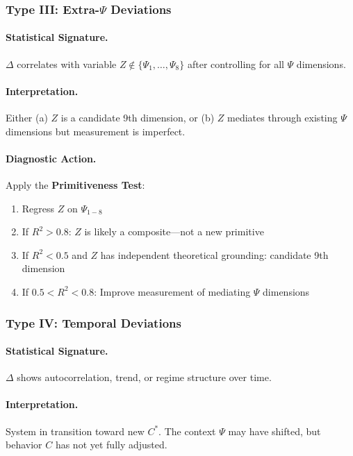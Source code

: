 \subsubsection{Type III: Extra-$\Psi$ Deviations}

\paragraph{Statistical Signature.}
$\Delta$ correlates with variable $Z \notin \{\Psi_1, \ldots, \Psi_8\}$ 
after controlling for all $\Psi$ dimensions.

\paragraph{Interpretation.}
Either (a) $Z$ is a candidate 9th dimension, or (b) $Z$ mediates through 
existing $\Psi$ dimensions but measurement is imperfect.

\paragraph{Diagnostic Action.}
Apply the \textbf{Primitiveness Test}:
\begin{enumerate}
    \item Regress $Z$ on $\Psi_{1-8}$
    \item If $R^2 > 0.8$: $Z$ is likely a composite---not a new primitive
    \item If $R^2 < 0.5$ and $Z$ has independent theoretical grounding: 
          candidate 9th dimension
    \item If $0.5 < R^2 < 0.8$: Improve measurement of mediating $\Psi$ dimensions
\end{enumerate}

\subsubsection{Type IV: Temporal Deviations}

\paragraph{Statistical Signature.}
$\Delta$ shows autocorrelation, trend, or regime structure over time.

\paragraph{Interpretation.}
System in transition toward new $C^*$. The context $\Psi$ may have shifted, 
but behavior $C$ has not yet fully adjusted.

